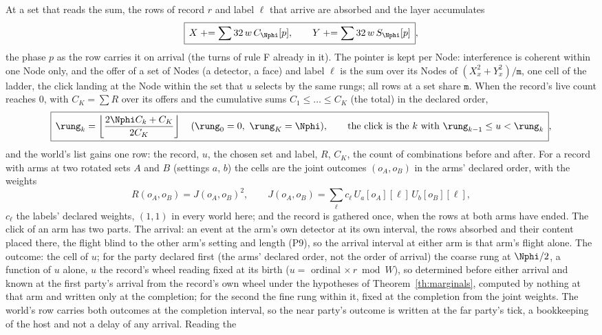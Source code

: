 \begin{definition}\label{def:click}
At a set that reads the sum, the rows of record $r$ and label $\ell$ that
arrive are absorbed and the layer accumulates
\begin{equation}
\boxed{\,X \mathrel{+}= \sum 32\,w\,C_{\Nphi}[p],\qquad Y \mathrel{+}= \sum 32\,w\,S_{\Nphi}[p]\,},
\end{equation}
the phase $p$ as the row carries it on arrival (the turns of rule F
already in it). The pointer is kept per Node:
interference is coherent within one Node only, and the offer of a set of
Nodes (a detector, a face) and label $\ell$ is the sum over its Nodes of
$(X_x^2 + Y_x^2)/\mathtt m$, one cell of the ladder, the click landing at the Node
within the set that $u$ selects by the same rungs; all rows at a set share
$\mathtt m$. When the record's live count reaches $0$, with $C_K = \sum R$ over its
offers and the cumulative sums $C_1 \le \dots \le C_K$ (the total) in the declared
order,
\begin{equation}
\boxed{\,\rung_k = \left\lfloor \frac{2\Nphi C_k + C_K}{2C_K} \right\rfloor \quad (\rung_0 = 0,\ \rung_K = \Nphi),
\qquad \text{the click is the } k \text{ with } \rung_{k-1} \le u < \rung_k\,},
\label{eq:rung}
\end{equation}
and the world's list gains one row: the record, $u$, the chosen set and
label, $R$, $C_K$, the count of combinations before and after. For a record
with arms at two rotated sets $A$ and $B$ (settings $a$, $b$) the cells
are the joint outcomes $(o_A, o_B)$ in the arms' declared order, with
the weights
\begin{equation}
R(o_A, o_B) = J(o_A, o_B)^2,\qquad J(o_A, o_B) = \sum_\ell c_\ell\,U_a[o_A][\ell]\,U_b[o_B][\ell],
\label{eq:joint}
\end{equation}
$c_\ell$ the labels' declared weights, $(1, 1)$ in every world here; and the record is gathered once, when the rows at both arms have ended. The click of an arm has two parts. The arrival: an event at the arm's own detector at its own interval, the rows absorbed and their content placed there, the flight blind to the other arm's setting and length (P9), so the arrival interval at either arm is that arm's flight alone. The outcome: the cell of $u$; for the party declared first (the arms' declared order, not the order of arrival) the coarse rung at $\Nphi/2$, a function of $u$ alone, $u$ the record's wheel reading fixed at its birth ($u = $ ordinal $\times\, r \bmod W$), so determined before either arrival and known at the first party's arrival from the record's own wheel under the hypotheses of Theorem~\ref{th:marginals}, computed by nothing at that arm and written only at the completion; for the second the fine rung within it, fixed at the completion from the joint weights. The world's row carries both outcomes at the completion interval, so the near party's outcome is written at the far party's tick, a bookkeeping of the host and not a delay of any arrival. Reading the

\end{definition}
